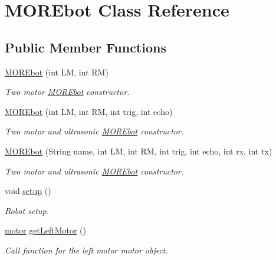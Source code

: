 \hypertarget{class_m_o_r_ebot}{}\section{M\+O\+R\+Ebot Class Reference}
\label{class_m_o_r_ebot}
\subsection*{Public Member Functions}
\begin{DoxyCompactItemize}
\item 
\mbox{\hyperlink{class_m_o_r_ebot_a1939c1344ae853e5830c61ceaa54e536}{M\+O\+R\+Ebot}} (int LM, int RM)
\begin{DoxyCompactList}\small\item\em Two motor \mbox{\hyperlink{class_m_o_r_ebot}{M\+O\+R\+Ebot}} constructor. \end{DoxyCompactList}\item 
\mbox{\hyperlink{class_m_o_r_ebot_aac1c702a9b4452351d82a64877c6598b}{M\+O\+R\+Ebot}} (int LM, int RM, int trig, int echo)
\begin{DoxyCompactList}\small\item\em Two motor and ultrasonic \mbox{\hyperlink{class_m_o_r_ebot}{M\+O\+R\+Ebot}} constructor. \end{DoxyCompactList}\item 
\mbox{\hyperlink{class_m_o_r_ebot_a46931ade34f53b3e24e5e2035e14051f}{M\+O\+R\+Ebot}} (String name, int LM, int RM, int trig, int echo, int rx, int tx)
\begin{DoxyCompactList}\small\item\em Two motor and ultrasonic \mbox{\hyperlink{class_m_o_r_ebot}{M\+O\+R\+Ebot}} constructor. \end{DoxyCompactList}\item 
void \mbox{\hyperlink{class_m_o_r_ebot_a61fbcee98b031e74de85d9651b4e2133}{setup}} ()
\begin{DoxyCompactList}\small\item\em Robot setup. \end{DoxyCompactList}\item 
\mbox{\hyperlink{classmotor}{motor}} \mbox{\hyperlink{class_m_o_r_ebot_aefc49a4089db0e15f57dd7f8a27ad27c}{get\+Left\+Motor}} ()
\begin{DoxyCompactList}\small\item\em Call function for the left motor motor object. \end{DoxyCompactList}\item 

\end{DoxyCompactItemize}
